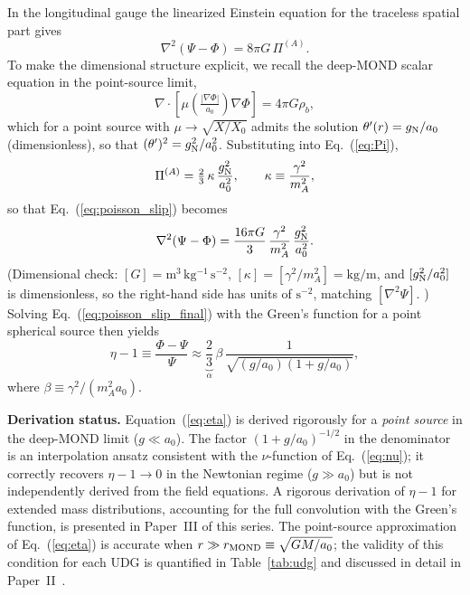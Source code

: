 \documentclass[aps,prd,twocolumn,showpacs,superscriptaddress]{revtex4-2}
\newcommand{\aO}{a_0}
\newcommand{\Xzero}{X_0}
\newcommand{\gN}{g_{\rm N}}
\begin{document}
In the longitudinal gauge the linearized Einstein equation for the
traceless spatial part gives
\begin{equation}
  \nabla^2(\Psi-\Phi) = 8\pi G\,\Pi^{(A)}.
  \label{eq:poisson_slip}
\end{equation}
To make the dimensional structure explicit, we recall the
deep-MOND scalar equation in the point-source limit,
\begin{equation}
  \nabla\cdot\!\left[\mu\!\left(\tfrac{|\nabla\Phi|}{\aO}\right)\nabla\Phi\right]
  = 4\pi G\rho_b,
\end{equation}
which for a point source with $\mu \to \sqrt{X/\Xzero}$ admits the
solution $\theta'(r) = \gN/\aO$ (dimensionless), so that
$(\theta')^2 = \gN^2/\aO^2$. Substituting into Eq.~(\ref{eq:Pi}),
\begin{equation}
  \Pi^{(A)} = \tfrac{2}{3}\,\kappa\,\frac{\gN^2}{\aO^2},
  \qquad \kappa \equiv \frac{\gamma^2}{m_A^2},
\end{equation}
so that Eq.~(\ref{eq:poisson_slip}) becomes
\begin{equation}
  \nabla^2(\Psi-\Phi)
  = \frac{16\pi G}{3}\,\frac{\gamma^2}{m_A^2}\,\frac{\gN^2}{\aO^2}.
  \label{eq:poisson_slip_final}
\end{equation}
(Dimensional check: $[G]=\mathrm{m^3\,kg^{-1}\,s^{-2}}$,
$[\kappa]=[\gamma^2/m_A^2]=\mathrm{kg/m}$, and
$[\gN^2/\aO^2]$ is dimensionless, so the right-hand side has
units of $\mathrm{s^{-2}}$, matching $[\nabla^2\Psi]$. \checkmark)
Solving Eq.~(\ref{eq:poisson_slip_final}) with the Green's function
for a point spherical source then yields
\begin{equation}
  \eta - 1 \equiv \frac{\Phi-\Psi}{\Psi}
  \approx \underbrace{\frac{2}{3}}_{\alpha}\,\beta\,
  \frac{1}{\sqrt{(g/\aO)(1+g/\aO)}},
  \label{eq:eta}
\end{equation}
where $\beta \equiv \gamma^2/(m_A^2\aO)$.

\textbf{Derivation status.} Equation~(\ref{eq:eta}) is derived
rigorously for a \emph{point source} in the deep-MOND limit
($g \ll \aO$). The factor $(1+g/\aO)^{-1/2}$ in the denominator is
an interpolation ansatz consistent with the $\nu$-function of
Eq.~(\ref{eq:nu}); it correctly recovers $\eta - 1 \to 0$ in the
Newtonian regime ($g \gg \aO$) but is not independently derived from
the field equations. A rigorous derivation of $\eta-1$ for extended
mass distributions, accounting for the full convolution with the
Green's function, is presented in Paper~III of this series. The
point-source approximation of Eq.~(\ref{eq:eta}) is accurate when
$r \gg r_{\rm MOND} \equiv \sqrt{GM/\aO}$; the validity of this
condition for each UDG is quantified in Table~\ref{tab:udg} and
discussed in detail in Paper~II~\cite{MendesII2026}.
\end{document}
